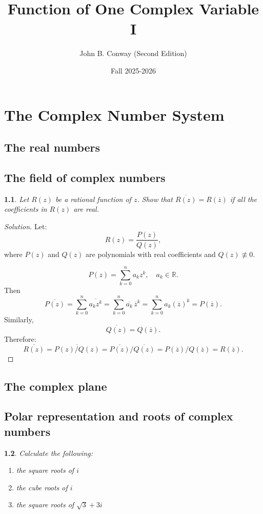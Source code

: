 \documentclass[12pt, a4paper]{report}
\title{Function of One Complex Variable I}
\author{
  John B. Conway (Second Edition)
}
\date{Fall 2025-2026}
\theoremstyle{spaced}
\newtheorem{exercise}{}
\newcommand{\setexercise}[1]{\setcounter{exercise}{#1-1}}
\begin{document}
\maketitle

\tableofcontents

\chapter{The Complex Number System}

\section{The real numbers}
\section{The field of complex numbers}

\setexercise{6}
\begin{exercise}
	Let $R(z)$ be a rational function of $z$. Show that $\overline{R(z)} = R(\overline{z})$ if all the coefficients in $R(z)$ are real.
\end{exercise}

\begin{proof}[Solution]
	Let:
	\[
		R(z) = \frac{P(z)}{Q(z)},
	\]
	where \(P(z)\) and \(Q(z)\) are polynomials with real coefficients and \(Q(z) \not\equiv 0\).

	\[
		P(z) = \sum_{k=0}^n a_k z^k, \quad a_k \in \mathbb{R}.
	\]
	Then
	\[
		\overline{P(z)}
		= \sum_{k=0}^n \overline{a_k z^k}
		= \sum_{k=0}^n \overline{a_k}\,\overline{z}^k
		= \sum_{k=0}^n a_k (\overline{z})^k
		= P(\overline{z}).
	\]
	Similarly,
	\[
		\overline{Q(z)} = Q(\overline{z}).
	\]
	Therefore:
	\[
		\overline{R(z)}
		= \overline{{P(z)}/{Q(z)}}
		= {\overline{P(z)}}/{\overline{Q(z)}}
			= {P(\overline{z})}/{Q(\overline{z})}
		= R(\overline{z}).
	\]
\end{proof}


\section{The complex plane}
\section{Polar representation and roots of complex numbers}
\setexercise{2}
\begin{exercise}
	Calculate the following:
	\begin{enumerate}
		\item the square roots of $i$
		\item the cube roots of $i$
		\item the square roots of $\sqrt{3} + 3i$
	\end{enumerate}
\end{exercise}
\end{document}
